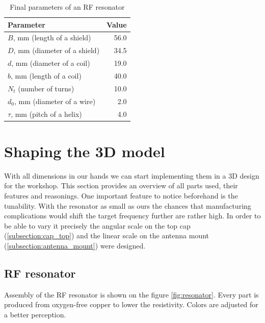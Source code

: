 \FloatBarrier
\begin{table}[h]
\centering
\begin{tabular}{| l | r |}
	\hline
	Parameter & Value\\
	\hline \hline
	$B$, mm (length of a shield) & 56.0 \\
	\hline
	$D$, mm (diameter of a shield) & 34.5 \\
	\hline
	$d$, mm (diameter of a coil) & 19.0 \\
	\hline
	$b$, mm (length of a coil) & 40.0 \\
	\hline
	$N_{t}$ (number of turns) & 10.0 \\
	\hline
	$d_0$, mm (diameter of a wire) & 2.0 \\
	\hline
	$\tau$, mm (pitch of a helix) & 4.0 \\
	\hline
\end{tabular}
\caption{Final parameters of an RF resonator}
\label{tbl:final_parameters}
\end{table}

\section{Shaping the 3D model}
\label{sec:shaping}
With all dimensions in our hands we can start implementing them in a 3D design for the workshop. This section provides an overview of all parts used, their features and reasonings. One important feature to notice beforehand is the tunability. With the resonator as small as ours the chances that manufacturing complications would shift the target frequency further are rather high. In order to be able to vary it precisely the angular scale on the top cap (\ref{subsection:cap_top}) and the linear scale on the antenna mount (\ref{subsection:antenna_mount}) were designed.

\clearpage
\subsection{RF resonator}
\label{subsection:rf_resonator_3d}
Assembly of the RF resonator is shown on the figure \ref{fig:resonator}. Every part is produced from oxygen-free copper to lower the resistivity. Colors are adjusted for a better perception.

